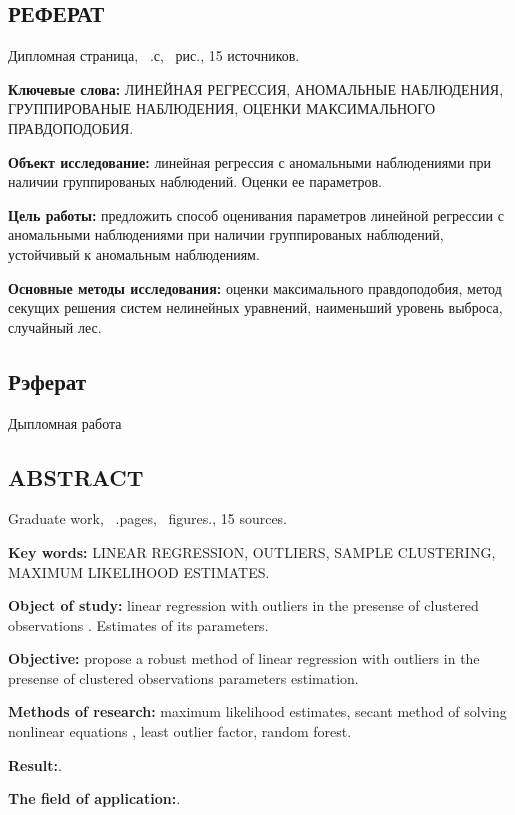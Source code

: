 \begin{center}
    \section*{РЕФЕРАТ}
\end{center}

Дипломная страница, ~.с, ~рис., 15 источников.

\textbf{Ключевые слова:} ЛИНЕЙНАЯ РЕГРЕССИЯ, АНОМАЛЬНЫЕ НАБЛЮДЕНИЯ, ГРУППИРОВАНЫЕ НАБЛЮДЕНИЯ, ОЦЕНКИ МАКСИМАЛЬНОГО ПРАВДОПОДОБИЯ.

\textbf{Объект исследование:} линейная регрессия с аномальными наблюдениями при наличии группированых наблюдений. Оценки ее параметров.

\textbf{Цель работы:} предложить способ оценивания параметров линейной регрессии с аномальными наблюдениями при наличии группированых наблюдений, устойчивый к аномальным наблюдениям.

\textbf{Основные методы исследования:} оценки максимального правдоподобия, метод секущих решения систем нелинейных уравнений, наименьший уровень выброса, случайный лес.

\newpage

\begin{center}
    \section*{Рэферат}
\end{center}
Дыпломная работа

\newpage

\begin{center}
    \section*{ABSTRACT}
\end{center}

Graduate work, ~.pages, ~figures., 15 sources.

\textbf{Key words:} LINEAR REGRESSION, OUTLIERS, SAMPLE CLUSTERING, MAXIMUM LIKELIHOOD ESTIMATES.

\textbf{Object of study:} linear regression with outliers in the presense of clustered observations . Estimates of its parameters.

\textbf{Objective:} propose a robust method of linear regression with outliers in the presense of clustered observations parameters estimation.

\textbf{Methods of research:} maximum likelihood estimates, secant method of solving nonlinear equations , least outlier factor, random forest.

\textbf{Result:}.

\textbf{The field of application:}.